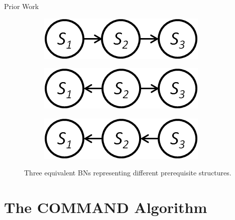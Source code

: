 \documentclass[hyperref={pdfpagelabels=false}]{beamer}
\begin{document}
\begin{frame}{Prior Work}
	\begin{figure}[!ht]\small
		\centering
		\begin{subfigure}[t]{0.3\linewidth}
			\centering
			\includegraphics[width=0.9\linewidth]{figures/s1s2s3.png}
			\caption{\label{fig:equivnet1}}
		\end{subfigure}
		\begin{subfigure}[t]{0.3\linewidth}
			\centering
			\includegraphics[width=0.9\linewidth]{figures/s2s1s3.png}
			\caption{\label{fig:equivnet2}}
		\end{subfigure}
		\begin{subfigure}[t]{0.3\linewidth}
			\centering
			\includegraphics[width=0.9\linewidth]{figures/s3s2s1.png}
			\caption{\label{fig:equivnet3}}			
		\end{subfigure}		
		\caption{Three equivalent BNs representing different prerequisite structures.\label{fig:equivnets} }
	\end{figure}	
\end{frame}

\section{The COMMAND Algorithm}
\end{document}
